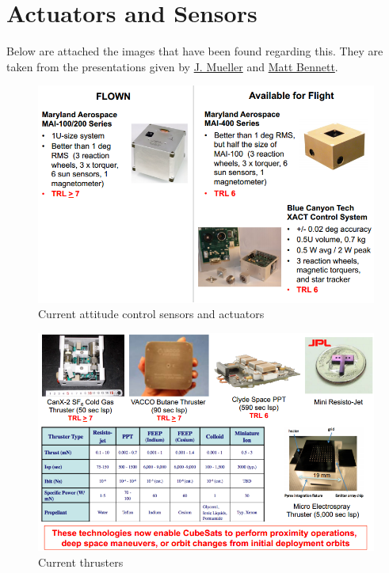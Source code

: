 \section{Actuators and Sensors}

Below are attached the images that have been found regarding this. They are taken from the presentations given by \href{http://kiss.caltech.edu/workshops/smallsat2012b/presentations/mueller.pdf}{J.	Mueller} and \href{http://kiss.caltech.edu/workshops/smallsat2012b/presentations/bennett.pdf}{Matt Bennett}. 

\begin{center}
\begin{figure}[!ht]
\includegraphics[scale=0.8]{attitude_control.png}
\caption{Current attitude control sensors and actuators}
\end{figure}
\newpage
\begin{figure}[!ht]
\includegraphics[scale=0.7]{prop_available.png}
\caption{Current thrusters}
\end{figure}
\end{center}

